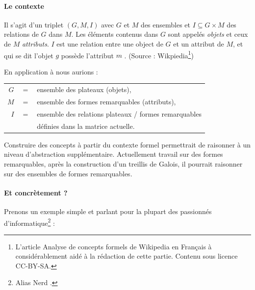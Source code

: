 \paragraph{Le contexte} Il s'agit d'un triplet $(G,M,I)$ avec $G$ et $M$ des ensembles et $I\subseteq G \times M$ des relations de $G$ dans $M$. Les éléments contenus dans $G$ sont appelés \emph{objets} et ceux de $M$ \emph{attributs}. $I$ est une relation entre une object de $G$ et un attribut de $M$, et qui se dit \og l'objet $g$ possède l'attribut $m$ \fg{}. (Source : Wikpiedia\footnote{L'article \og Analyse de concepts formels \fg{} de Wikipedia en Français à considérablement aidé à la rédaction de cette partie. Contenu sous licence CC-BY-SA.})

En application à \cogito{} nous aurions :

\begin{tabular}{r c l}
$G$ & $ = $ & ensemble des plateaux (objets),\\
$M$ & $ = $ & ensemble des formes remarquables (attributs),\\
$I$ & $ = $ & ensemble des relations plateaux / formes remarquables\\
& & définies dans la matrice actuelle.\\
\end{tabular}

Construire des concepts à partir du contexte formel permettrait de raisonner à un niveau d'abstraction supplémentaire. Actuellement \cogito{} travail sur des formes remarquables, après la construction d'un treillis de Galois, il pourrait raisonner sur des ensembles de formes remarquables.

\paragraph{Et concrètement ?}Prenons un exemple simple et parlant pour la plupart des passionnés d'informatique\footnote{Alias \og Nerd \fg{}.} : 

